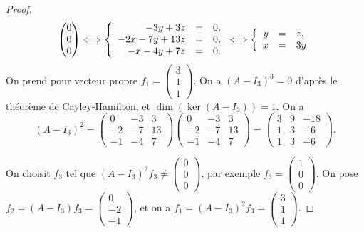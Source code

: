 \documentclass[12pt]{article}
\begin{document}
\begin{proof}
\begin{equation*}
\begin{pmatrix}
			0\\0\\0
		\end{pmatrix}\Longleftrightarrow
		\left\lbrace
			\begin{array}[]{rcl}
				-3y+3z &=& 0,\\
				-2x-7y+13z &=& 0,\\
				-x-4y+7z &=&0. 
			\end{array}
		\right.
		\Longleftrightarrow
		\left\lbrace
			\begin{array}[]{rcl}
				y&=&z,\\
				x&=&3y
			\end{array}
		\right.
	\end{equation*}
	On prend pour vecteur propre $f_1=\begin{pmatrix}
		3\\1\\1
	\end{pmatrix}$. On a $(A-I_3)^{3}=0$ d'après le théorème de Cayley-Hamilton, et $\dim(\ker(A-I_3))=1$. On a 
	\begin{equation*}
		(A-I_3)^{2}=
		\begin{pmatrix}
			0&-3&3\\
			-2&-7&13\\
			-1&-4&7
		\end{pmatrix}
		\begin{pmatrix}
			0&-3&3\\
			-2&-7&13\\
			-1&-4&7
		\end{pmatrix}
		=
		\begin{pmatrix}
			3&9&-18\\
			1&3&-6\\
			1&3&-6
		\end{pmatrix}.
	\end{equation*}

	On choisit $f_3$ tel que $(A-I_3)^{2}f_3\neq\begin{pmatrix}
		0\\0\\0
	\end{pmatrix}$, par exemple $f_3=\begin{pmatrix}
		1\\0\\0
	\end{pmatrix}$. On pose $f_2=(A-I_3)f_3=\begin{pmatrix}
		0\\-2\\-1
	\end{pmatrix}$, et on a $f_1=(A-I_3)^{2}f_3
	=
	\begin{pmatrix}
		3\\1\\1
	\end{pmatrix}$.


\end{proof}
\end{document}
